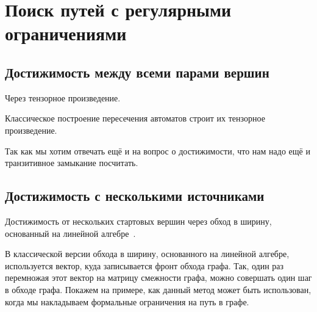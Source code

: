 \chapter{Поиск путей с регулярными ограничениями}

\section{Достижимость между всеми парами вершин}

Через тензорное произведение.

Классическое построение пересечения автоматов строит их тензорное произведение.

Так как мы хотим отвечать ещё и на вопрос о достижимости, что нам надо ещё и транзитивное замыкание посчитать.

\section{Достижимость с несколькими источниками}

Достижимость от нескольких стартовых вершин через обход в ширину, основанный на линейной алгебре~\cite{9286186}.

В классической версии обхода в ширину, основанного на линейной алгебре, используется вектор, куда записывается фронт обхода графа. Так, один раз перемножая этот вектор на матрицу смежности графа, можно совершать один шаг в обходе графа. Покажем на примере, как данный метод может быть использован, когда мы накладываем формальные ограничения на путь в графе. 

